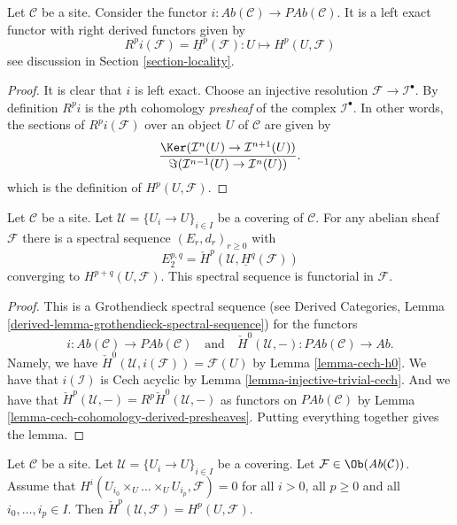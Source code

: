\begin{lemma}
\label{lemma-include}
Let $\mathcal{C}$ be a site.
Consider the functor
$i : \textit{Ab}(\mathcal{C}) \to \textit{PAb}(\mathcal{C})$.
It is a left exact functor with right derived functors given by
$$
R^pi(\mathcal{F}) = \underline{H}^p(\mathcal{F}) :
U \longmapsto H^p(U, \mathcal{F})
$$
see discussion in Section \ref{section-locality}.
\end{lemma}

\begin{proof}
It is clear that $i$ is left exact.
Choose an injective resolution $\mathcal{F} \to \mathcal{I}^\bullet$.
By definition $R^pi$ is the $p$th cohomology {\it presheaf}
of the complex $\mathcal{I}^\bullet$. In other words, the
sections of $R^pi(\mathcal{F})$ over an object $U$ of $\mathcal{C}$
are given by
$$
\frac{\Ker(\mathcal{I}^n(U) \to \mathcal{I}^{n + 1}(U))}
{\Im(\mathcal{I}^{n - 1}(U) \to \mathcal{I}^n(U))}.
$$
which is the definition of $H^p(U, \mathcal{F})$.
\end{proof}

\begin{lemma}
\label{lemma-cech-spectral-sequence}
Let $\mathcal{C}$ be a site. Let $\mathcal{U} = \{U_i \to U\}_{i \in I}$
be a covering of $\mathcal{C}$. For any abelian sheaf $\mathcal{F}$ there
is a spectral sequence $(E_r, d_r)_{r \geq 0}$ with
$$
E_2^{p, q} = \check{H}^p(\mathcal{U}, \underline{H}^q(\mathcal{F}))
$$
converging to $H^{p + q}(U, \mathcal{F})$.
This spectral sequence is functorial in $\mathcal{F}$.
\end{lemma}

\begin{proof}
This is a Grothendieck spectral sequence (see
Derived Categories, Lemma \ref{derived-lemma-grothendieck-spectral-sequence})
for the functors
$$
i :  \textit{Ab}(\mathcal{C}) \to \textit{PAb}(\mathcal{C})
\quad\text{and}\quad
\check{H}^0(\mathcal{U}, - ) : \textit{PAb}(\mathcal{C})
\to \textit{Ab}.
$$
Namely, we have $\check{H}^0(\mathcal{U}, i(\mathcal{F})) = \mathcal{F}(U)$
by Lemma \ref{lemma-cech-h0}. We have that $i(\mathcal{I})$ is
Cech acyclic by Lemma \ref{lemma-injective-trivial-cech}. And we
have that $\check{H}^p(\mathcal{U}, -) = R^p\check{H}^0(\mathcal{U}, -)$
as functors on $\textit{PAb}(\mathcal{C})$
by Lemma \ref{lemma-cech-cohomology-derived-presheaves}.
Putting everything together gives the lemma.
\end{proof}

\begin{lemma}
\label{lemma-cech-spectral-sequence-application}
Let $\mathcal{C}$ be a site.
Let $\mathcal{U} = \{U_i \to U\}_{i \in I}$ be a covering.
Let $\mathcal{F} \in \Ob(\textit{Ab}(\mathcal{C}))$.
Assume that $H^i(U_{i_0} \times_U \ldots \times_U U_{i_p}, \mathcal{F}) = 0$
for all $i > 0$, all $p \geq 0$ and all $i_0, \ldots, i_p \in I$.
Then $\check{H}^p(\mathcal{U}, \mathcal{F}) = H^p(U, \mathcal{F})$.
\end{lemma}

